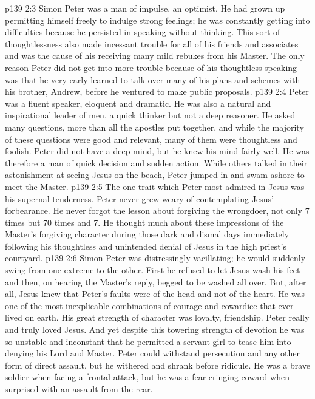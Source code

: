 \vs p139 2:3 \pc Simon Peter was a man of impulse, an optimist. He had grown up permitting himself freely to indulge strong feelings; he was constantly getting into difficulties because he persisted in speaking without thinking. This sort of thoughtlessness also made incessant trouble for all of his friends and associates and was the cause of his receiving many mild rebukes from his Master. The only reason Peter did not get into more trouble because of his thoughtless speaking was that he very early learned to talk over many of his plans and schemes with his brother, Andrew, before he ventured to make public proposals.
\vs p139 2:4 Peter was a fluent speaker, eloquent and dramatic. He was also a natural and inspirational leader of men, a quick thinker but not a deep reasoner. He asked many questions, more than all the apostles put together, and while the majority of these questions were good and relevant, many of them were thoughtless and foolish. Peter did not have a deep mind, but he knew his mind fairly well. He was therefore a man of quick decision and sudden action. While others talked in their astonishment at seeing Jesus on the beach, Peter jumped in and swam ashore to meet the Master.
\vs p139 2:5 \pc The one trait which Peter most admired in Jesus was his supernal tenderness. Peter never grew weary of contemplating Jesus’ forbearance. He never forgot the lesson about forgiving the wrongdoer, not only 7 times but 70 times and 7. He thought much about these impressions of the Master’s forgiving character during those dark and dismal days immediately following his thoughtless and unintended denial of Jesus in the high priest’s courtyard.
\vs p139 2:6 \pc Simon Peter was distressingly vacillating; he would suddenly swing from one extreme to the other. First he refused to let Jesus wash his feet and then, on hearing the Master’s reply, begged to be washed all over. But, after all, Jesus knew that Peter’s faults were of the head and not of the heart. He was one of the most inexplicable combinations of courage and cowardice that ever lived on earth. His great strength of character was loyalty, friendship. Peter really and truly loved Jesus. And yet despite this towering strength of devotion he was so unstable and inconstant that he permitted a servant girl to tease him into denying his Lord and Master. Peter could withstand persecution and any other form of direct assault, but he withered and shrank before ridicule. He was a brave soldier when facing a frontal attack, but he was a fear\hyp{}cringing coward when surprised with an assault from the rear.
